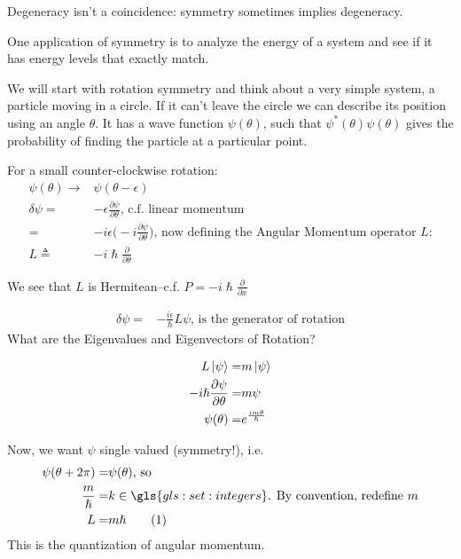 \documentclass[]{article}
\newcommand\numberthis{\addtocounter{equation}{1}\tag{\theequation}}
\begin{document}
Degeneracy isn't a coincidence: symmetry sometimes implies degeneracy.

One application of symmetry is to analyze the energy of a system and see if it has energy levels that exactly match.

We will start with rotation symmetry and think about a very simple system, a particle moving in a circle. If it can't leave the circle we can describe its position using an angle $\theta$. It has a wave function $\psi(\theta)$, such that $\psi^*(\theta)\psi(\theta)$ gives the probability of finding the particle at a particular point.

For a small counter-clockwise rotation:
\begin{align*}
	\psi(\theta) \rightarrow & \psi(\theta - \epsilon)\\
	\delta\psi =& - \epsilon \frac{\partial \psi}{\partial \theta} \text{, c.f. linear momentum}\\
	=& -i \epsilon \big(-i \frac{\partial \psi}{\partial \theta}\big) \text{, now defining the Angular Momentum operator $L$:}\\
	L \triangleq& - i  \hslash \frac{\partial}{\partial \theta} 
\end{align*}

We see that $L$ is Hermitean--c.f. $P=-i\hslash \frac{\partial}{\partial x}$

\begin{align}
	\delta\psi =& - \frac{i \epsilon}{\hslash} L \psi \text{, is the generator of rotation}
\end{align}
What are the Eigenvalues and Eigenvectors of Rotation?

\begin{align*}
	L\ket{\psi} =& m \ket{\psi}\\
	-i \hslash \frac{\partial \psi}{\partial \theta} =& m \psi\\
	\psi(\theta) =& e^{\frac{i m \theta}{\hslash}}
\end{align*}

Now, we want $\psi$ single valued (symmetry!), i.e.
\begin{align*}
	\psi(\theta + 2\pi) =& \psi(\theta) \text{, so}\\
	\frac{m}{\hslash}=&k\in  \gls{gls:set:integers} \text{.  By convention, redefine $m$}\\
	L=& m \hslash \numberthis \label{eq:magnetic:quantum:number}
\end{align*}
This is the quantization of angular momentum.
\end{document}
